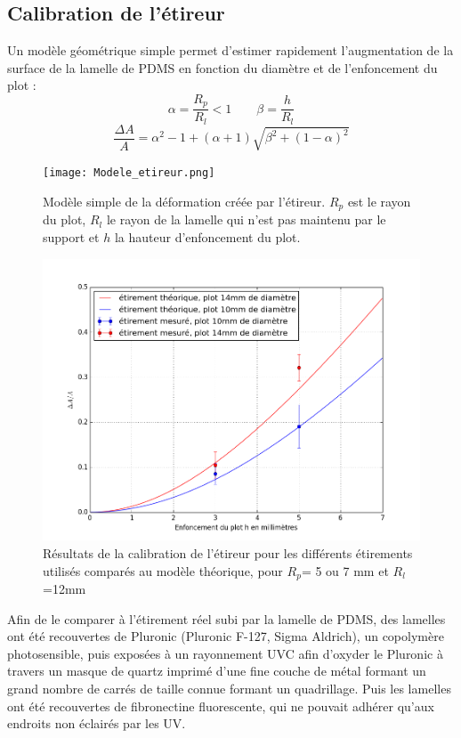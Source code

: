 	\subsection{Calibration de l'étireur}
	
	Un modèle géométrique simple permet d'estimer rapidement l'augmentation de la surface de la lamelle de PDMS en fonction du diamètre et de l'enfoncement du plot : 
	$$\alpha=\frac{R_p}{R_l}<1 \qquad \beta=\frac{h}{R_l}$$
	$$ \frac{\Delta A}{A} = \alpha^2-1+(\alpha+1)\sqrt{\beta^2+(1-\alpha)^2}$$ 	
		
	\begin{figure}[h!]
		\texttt{[image: Modele\_etireur.png]}
		\caption{Modèle simple de la déformation créée par l'étireur. $R_p$ est le rayon du plot, $R_l$ le rayon de la lamelle qui n'est pas maintenu par le support et $h$ la hauteur d'enfoncement du plot.}
		\end{figure}	
		
		\begin{figure}
		\includegraphics[scale=0.5]{Figures/Calibration_etireur.png} 
		\caption{Résultats de la calibration de l'étireur pour les différents étirements utilisés comparés au modèle théorique, pour $R_p$= 5 ou 7 mm et $R_l$=12mm}
		\end{figure}
	Afin de le comparer à l'étirement réel subi par la lamelle de PDMS, des lamelles ont été recouvertes de Pluronic (Pluronic F-127, Sigma Aldrich), un copolymère photosensible, puis exposées à un rayonnement UVC afin d'oxyder le Pluronic à travers un masque de quartz imprimé d'une fine couche de métal formant un grand nombre de carrés de taille connue formant un quadrillage. Puis les lamelles ont été recouvertes de fibronectine fluorescente, qui ne pouvait adhérer qu'aux endroits non éclairés par les UV. 
	
